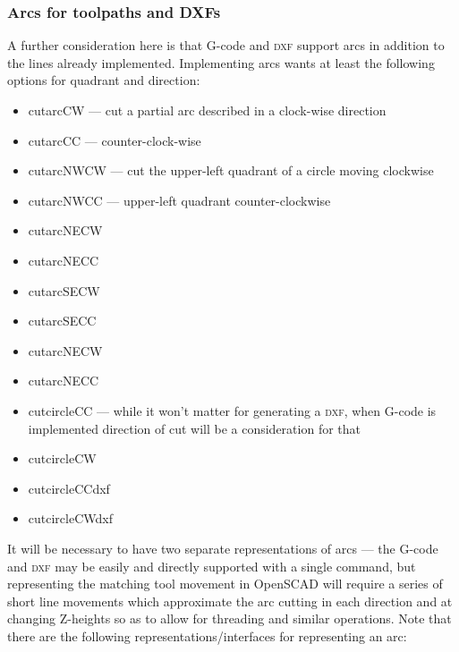 \documentclass{ltxdoc}
\begin{document}
\subsubsection{Arcs for toolpaths and DXFs}
 
A further consideration here is that G-code and \textsc{dxf} support arcs in addition to the lines already implemented. Implementing arcs wants at least the following options for quadrant and direction:
 
\begin{itemize}
\item cutarcCW --- cut a partial arc described in a clock-wise direction
\item cutarcCC --- counter-clock-wise
\item cutarcNWCW --- cut the upper-left quadrant of a circle moving clockwise
\item cutarcNWCC --- upper-left quadrant counter-clockwise
\item cutarcNECW
\item cutarcNECC
\item cutarcSECW
\item cutarcSECC
\item cutarcNECW
\item cutarcNECC
\item cutcircleCC --- while it won’t matter for generating a \textsc{dxf}, when G-code is implemented
                      direction of cut will be a consideration for that
\item cutcircleCW
\item cutcircleCCdxf
\item cutcircleCWdxf
\end{itemize}
 
It will be necessary to have two separate representations of arcs --- the G-code and \textsc{dxf} may be easily and directly supported with a single command, but representing the matching tool movement in OpenSCAD will require a series of short line movements which approximate the arc cutting in each direction and at changing Z-heights so as to allow for threading and similar operations. 
Note that there are the following representations/interfaces for representing an arc:

 
\end{document}

